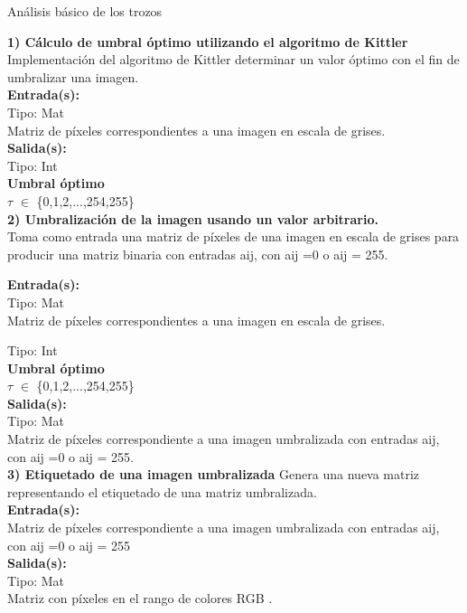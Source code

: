 \documentclass{report}
\begin{document}
\LARGE An\'alisis b\'asico de los trozos\\
\large
\begin{flushleft} 
 \textbf{1) C\'alculo de umbral \'optimo utilizando el algoritmo de Kittler}\\[0.1 cm]%
Implementaci\'on del algoritmo de Kittler determinar un valor \'optimo con el fin de umbralizar una imagen.\\[0.1 cm]

\textbf{Entrada(s):}\\
Tipo: Mat\\
Matriz de p\'ixeles correspondientes a una imagen en escala de grises.\\
\textbf{Salida(s):}\\
	Tipo: Int\\
\textbf{Umbral \'optimo} \\
	 \(\tau\) \(\in\) \{0,1,2,...,254,255\}\\[0.5 cm]

\textbf{2) Umbralizaci\'on de la imagen usando un valor arbitrario.}\\%
Toma como entrada una matriz de p\'ixeles de una imagen en escala de grises para producir una matriz binaria con entradas aij, con \hspace{1cm}aij =0 o aij = 255.

\textbf{Entrada(s):}\\
 Tipo: Mat\\
Matriz de p\'ixeles correspondientes a una imagen en escala de grises.

Tipo: Int\\
\textbf{Umbral \'optimo} \\
	 \(\tau\) \(\in\) \{0,1,2,...,254,255\}\\[0.3 cm]

\textbf{Salida(s):}\\
Tipo: Mat\\
Matriz de p\'ixeles correspondiente a una imagen umbralizada con entradas aij, con aij =0 o aij = 255.\\[0.5 cm]

\textbf{3) Etiquetado de una imagen umbralizada}%
Genera una nueva matriz representando el etiquetado de una matriz umbralizada.\\[0.1 cm]

\textbf{Entrada(s):}\\[0.1 cm]
	Matriz de p\'ixeles correspondiente a una imagen umbralizada con entradas aij, con aij =0 o aij = 255\\
\textbf{Salida(s):}\\[0.1 cm]
	Tipo: Mat\\
	Matriz con p\'ixeles en el rango de colores RGB .\\[0.5 cm]


\end{flushleft}
\end{document}
